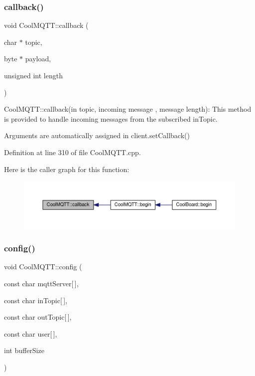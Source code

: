 \subsubsection{\texorpdfstring{callback()}{callback()}}
{\footnotesize\ttfamily void Cool\+M\+Q\+T\+T\+::callback (\begin{DoxyParamCaption}\item[{char $\ast$}]{topic,  }\item[{byte $\ast$}]{payload,  }\item[{unsigned int}]{length }\end{DoxyParamCaption})}

Cool\+M\+Q\+T\+T\+::callback(in topic, incoming message , message length)\+: This method is provided to handle incoming messages from the subscribed in\+Topic.

Arguments are automatically assigned in client.\+set\+Callback() 

Definition at line 310 of file Cool\+M\+Q\+T\+T.\+cpp.

Here is the caller graph for this function\+:
\nopagebreak
\begin{figure}[H]
\begin{center}
\leavevmode
\includegraphics[width=350pt]{class_cool_m_q_t_t_a30d82ad665bfb603f46ecdbc290775df_icgraph}
\end{center}
\end{figure}
\mbox{\label{class_cool_m_q_t_t_a9b703de4f1358f0ee7a5e8c44979c648}} 
\subsubsection{\texorpdfstring{config()}{config()}\hspace{0.1cm}{\footnotesize\ttfamily [1/2]}}
{\footnotesize\ttfamily void Cool\+M\+Q\+T\+T\+::config (\begin{DoxyParamCaption}\item[{const char}]{mqtt\+Server\mbox{[}$\,$\mbox{]},  }\item[{const char}]{in\+Topic\mbox{[}$\,$\mbox{]},  }\item[{const char}]{out\+Topic\mbox{[}$\,$\mbox{]},  }\item[{const char}]{user\mbox{[}$\,$\mbox{]},  }\item[{int}]{buffer\+Size }\end{DoxyParamCaption})}

